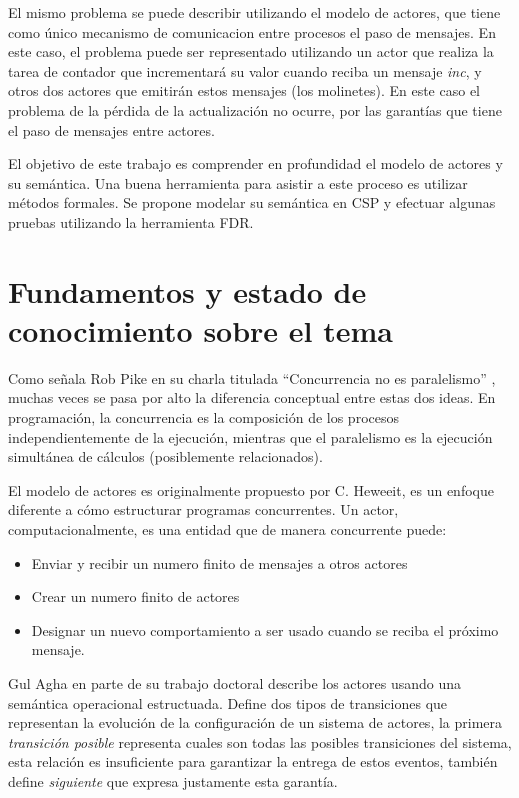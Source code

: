 \documentclass{article}
\begin{document}
El mismo problema se puede describir utilizando el modelo de actores, que tiene como único mecanismo de comunicacion entre procesos el paso de mensajes. En este caso, el problema puede ser representado utilizando un actor que realiza la tarea de contador que incrementará su valor cuando reciba un mensaje \emph{inc}, y otros dos actores que emitirán estos mensajes (los molinetes). En este caso el problema de la pérdida de la actualización no ocurre, por las garantías que tiene el paso de mensajes entre actores. 

El objetivo de este trabajo es comprender en profundidad el modelo de actores y su semántica. Una buena herramienta para asistir a este proceso es utilizar métodos formales. Se propone modelar su semántica en CSP y efectuar algunas pruebas utilizando la herramienta FDR\cite{fdr}.

\section{Fundamentos y estado de conocimiento sobre el tema}
 
Como señala Rob Pike en su charla titulada ``Concurrencia no es paralelismo'' \cite{rpike13_cnp}, muchas veces se pasa por alto la diferencia conceptual entre estas dos ideas. En programación, la concurrencia es la composición de los procesos independientemente de la ejecución, mientras que el paralelismo es la ejecución simultánea de cálculos (posiblemente relacionados). 

El modelo de actores es originalmente propuesto por C. Heweeit\cite{Wyatt:2013:AC:2663429}, es un enfoque diferente a cómo estructurar programas concurrentes. Un actor, computacionalmente, es una entidad que de manera concurrente puede:

\begin{itemize}
\item Enviar y recibir un numero finito de mensajes a otros actores
\item Crear un numero finito de actores
\item Designar un nuevo comportamiento a ser usado cuando se reciba el próximo mensaje.
\end{itemize}

Gul Agha\cite{Agha:1986:AMC:7929} en parte de su trabajo doctoral describe los actores usando una semántica operacional estructuada\cite{Plotkin81astructural}. Define dos tipos de transiciones que representan la evolución de la configuración de un sistema de actores, la primera \emph{transición posible} representa cuales son todas las posibles transiciones del sistema, esta relación es insuficiente para garantizar la entrega de estos eventos, también define \emph{siguiente} que expresa justamente esta garantía.
\end{document}
